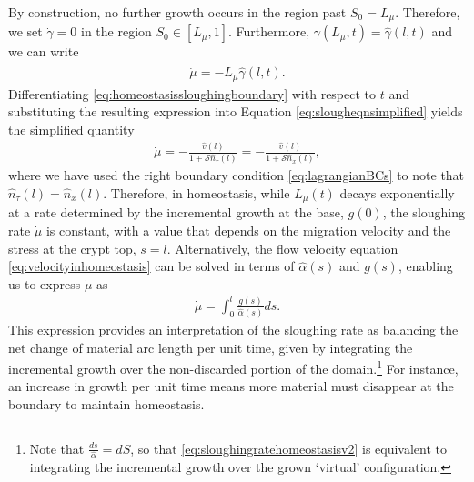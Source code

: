 By construction, no further growth occurs in the region past $S_0 = L_\mu$. Therefore, we set $\dot{\gamma} = 0$ in the region $S_0\in[L_\mu, 1]$. Furthermore, $\gamma(L_\mu, t) = \hat{\gamma}(l, t)$ and we can write
\begin{align}
\dot{\mu} = -\dot{L}_\mu\hat{\gamma}(l, t).\label{eq:slougheqnsimplified}
\end{align}
Differentiating \eqref{eq:homeostasissloughingboundary} with respect to $t$ and substituting the resulting expression into Equation \eqref{eq:slougheqnsimplified} yields the simplified quantity
\begin{align}
\dot{\mu} = -\frac{\hat{v}(l)}{1 + \mathcal{S}\hat{n}_\tau(l)} =  -\frac{\hat{v}(l)}{1 + \mathcal{S}\hat{n}_x(l)},\label{eq:sloughingratehomeostasis}
\end{align}
where we have used the right boundary condition \eqref{eq:lagrangianBCs} to note that $\hat{n}_\tau(l) = \hat{n}_x(l)$. Therefore, in homeostasis, while $L_\mu(t)$ decays exponentially at a rate determined by the incremental growth at the base, $g(0)$, the sloughing rate $\dot{\mu}$ is constant, with a value that depends on the migration velocity and the stress at the crypt top, $s = l$. Alternatively, the flow velocity equation \eqref{eq:velocityinhomeostasis} can be solved in terms of $\hat{\alpha}(s)$ and $g(s)$, enabling us to express $\dot{\mu}$ as
\begin{align}
\dot{\mu} = \int^l_0\frac{g(s)}{\hat{\alpha}(s)}ds.\label{eq:sloughingratehomeostasisv2}
\end{align}
This expression provides an interpretation of the sloughing rate as balancing the net change of material arc length per unit time, given by integrating the incremental growth over the non-discarded portion of the domain.\footnote{Note that $\frac{ds}{\hat\alpha}=dS$, so that \eqref{eq:sloughingratehomeostasisv2} is equivalent to integrating the incremental growth over the grown `virtual' configuration.} For instance, an increase in growth per unit time means more material must disappear at the boundary to maintain homeostasis. %
